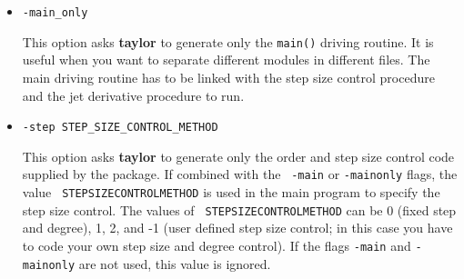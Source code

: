 \documentclass[10pt]{article}
\theoremstyle{remark}
\newcommand{\taylorname}{{\bf taylor}}
\begin{document}
\begin{itemize}
{This option select a jet library. By default, \taylorname{} uses the
\verb+jet_tree+ library. This option allows you to overwrite that with
a special purpose library. Possible value for \verb+JETLIBRARY+ are:
\begin{itemize}
    \item \verb+jet1_1+ one symbol, degree one. The arithmetic is
      implemented using C macros.
    \item \verb+jet1+  one symbol, arbitrary degree. 
    \item \verb+jet_1+ degree one, arbitrary number of symbols.
    \item \verb+jet2+ two symbols, arbitrary degree.
    \item \verb+jet_2+ degree two, arbitrary number of symbols.
    \item \verb+jet_m+ an naive implementation of the general case,
      arbitrary number of symbols, arbitrary degree. This
      implementation works well when the jet size is below 1000 terms,
      i.e., when ${{d+m} \choose {d}} < 1000$.
    \item \verb+jet_tree+ a general library\footnote{based on {\tt
      http://www.maia.ub.es/dsg/param/chapter2.html}}. This is the
      default.
\end{itemize}
}
\item{\verb+-main_only+

This option asks \taylorname{} to generate only the \verb+main()+
driving routine. It is useful when you want to separate different
modules in different files. The main driving routine has to be linked
with the step size control procedure and the jet derivative procedure
to run.  }

\item{\verb+-step STEP_SIZE_CONTROL_METHOD+

This option asks \taylorname{} to generate only the order and step
size control code supplied by the package. If combined with the {\tt
  -main} or {\tt -mainonly} flags, the value {\tt
  STEPSIZECONTROLMETHOD} is used in
the main program to specify the step size control. The values of {\tt
  STEPSIZECONTROLMETHOD} can be 0
(fixed step and degree), 1, 2, and -1 (user defined step size control;
in this case you have to code your own step size and degree
control). If the flags {\tt -main} and {\tt -mainonly} are
not used, this value is ignored.

}
\end{itemize}
\end{document}
